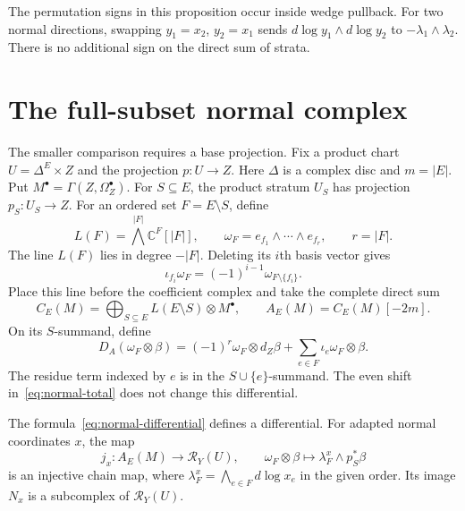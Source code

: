 The permutation signs in this proposition occur inside wedge pullback.
For two normal directions, swapping $y_1=x_2$, $y_2=x_1$ sends
$d\log y_1\wedge d\log y_2$ to $-\lambda_1\wedge\lambda_2$.
There is no additional sign on the direct sum of strata.

\section{The full-subset normal complex}
\label{sec:normal-complex}

The smaller comparison requires a base projection.
Fix a product chart $U=\Delta^E\times Z$ and the projection $p:U\to Z$.
Here $\Delta$ is a complex disc and $m=|E|$.
Put $M^\bullet=\Gamma(Z,\Omega_Z^\bullet)$.
For $S\subseteq E$, the product stratum $U_S$ has projection $p_S:U_S\to Z$.
For an ordered set $F=E\setminus S$, define
\[
L(F)=\bigwedge^{|F|}\mathbb C^F[|F|],
\qquad
\omega_F=e_{f_1}\wedge\cdots\wedge e_{f_r},\qquad r=|F|.
\]
The line $L(F)$ lies in degree $-|F|$.
Deleting its $i$th basis vector gives
\[
\iota_{f_i}\omega_F=(-1)^{i-1}\omega_{F\setminus\{f_i\}}.
\]
Place this line before the coefficient complex and take the complete direct sum
\begin{equation}
\label{eq:normal-total}
C_E(M)=\bigoplus_{S\subseteq E}L(E\setminus S)\otimes M^\bullet,
\qquad A_E(M)=C_E(M)[-2m].
\end{equation}
On its $S$-summand, define
\begin{equation}
\label{eq:normal-differential}
D_A(\omega_F\otimes\beta)
=(-1)^r\omega_F\otimes d_Z\beta
+\sum_{e\in F}\iota_e\omega_F\otimes\beta.
\end{equation}
The residue term indexed by $e$ is in the $S\cup\{e\}$-summand.
The even shift in~\eqref{eq:normal-total} does not change this differential.

\begin{lemma}
\label{lem:normal-embedding}
The formula~\eqref{eq:normal-differential} defines a differential.
For adapted normal coordinates $x$, the map
\begin{equation}
\label{eq:normal-embedding}
j_x:A_E(M)\longrightarrow\mathcal R_Y(U),
\qquad
\omega_F\otimes\beta\longmapsto
\lambda_F^x\wedge p_S^*\beta
\end{equation}
is an injective chain map, where $\lambda_F^x=\bigwedge_{e\in F}d\log x_e$ in the given order.
Its image $N_x$ is a subcomplex of $\mathcal R_Y(U)$.
\end{lemma}

